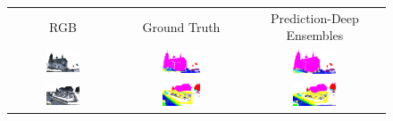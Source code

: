     \begin{figure}[h!]
        \begin{tabular}{ccc}
            RGB & Ground Truth & Prediction-Deep Ensembles \\
            \includegraphics[width=0.33\textwidth, height=0.18\textheight]{images/seg_output/sem3d_seg_output/1_RGB.pdf} &
            \includegraphics[width=0.33\textwidth, height=0.18\textheight]{images/seg_output/sem3d_seg_output/1_GT.pdf}& 
            \includegraphics[width=0.33\textwidth, height=0.18\textheight]{images/seg_output/sem3d_seg_output/1_Pred.pdf}\\

            \includegraphics[width=0.33\textwidth, height=0.18\textheight]{images/seg_output/sem3d_seg_output/2_RGB.pdf} &
            \includegraphics[width=0.33\textwidth, height=0.18\textheight]{images/seg_output/sem3d_seg_output/2_GT.pdf}& 
            \includegraphics[width=0.33\textwidth, height=0.18\textheight]{images/seg_output/sem3d_seg_output/2_Pred.pdf}\\


\end{tabular}
\end{figure}
